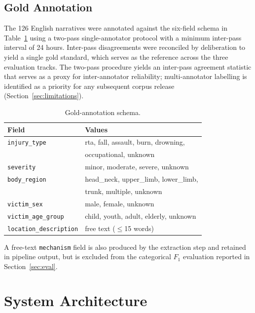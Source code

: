 \documentclass[conference]{IEEEtran}
\begin{document}
\subsection{Gold Annotation}
The 126 English narratives were annotated against the six-field
schema in Table~\ref{tab:schema} using a two-pass single-annotator
protocol with a minimum inter-pass interval of 24 hours.
Inter-pass disagreements were reconciled by deliberation to yield a
single gold standard, which serves as the reference across the three
evaluation tracks. The two-pass procedure yields an inter-pass
agreement statistic that serves as a proxy for inter-annotator
reliability; multi-annotator labelling is identified as a priority
for any subsequent corpus release (Section~\ref{sec:limitations}).

\begin{table}[!t]
\caption{Gold-annotation schema.}
\label{tab:schema}
\centering
\small
\begin{tabular}{ll}
\toprule
\textbf{Field} & \textbf{Values} \\
\midrule
\texttt{injury\_type}          & rta, fall, assault, burn, drowning, \\
                               & occupational, unknown \\
\texttt{severity}              & minor, moderate, severe, unknown \\
\texttt{body\_region}          & head\_neck, upper\_limb, lower\_limb, \\
                               & trunk, multiple, unknown \\
\texttt{victim\_sex}           & male, female, unknown \\
\texttt{victim\_age\_group}    & child, youth, adult, elderly, unknown \\
\texttt{location\_description} & free text ($\leq$15 words) \\
\bottomrule
\end{tabular}
\end{table}

A free-text \texttt{mechanism} field is also produced by the
extraction step and retained in pipeline output, but is excluded from
the categorical $F_{1}$ evaluation reported in
Section~\ref{sec:eval}.


\section{System Architecture}
\label{sec:arch}
\end{document}
